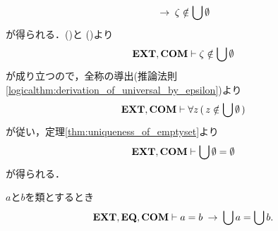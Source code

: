 \begin{sketch}
\begin{align}
			\hspace{0.25em}\rightarrow\hspace{0.25em} \zeta \notin \bigcup \emptyset
			\label{fom:the_union_of_the_emptyset_is_empty_2}
		\end{align}
		が得られる．()と
		()より
		\begin{align}
			\mbox{{\bf EXT}},\mbox{\bf COM} \vdash \zeta \notin \bigcup \emptyset
		\end{align}
		が成り立つので，全称の導出(推論法則\ref{logicalthm:derivation_of_universal_by_epsilon})より
		\begin{align}
			\mbox{{\bf EXT}},\mbox{\bf COM} \vdash \forall z\, (\, z \notin \bigcup \emptyset\, )
		\end{align}
		が従い，定理\ref{thm:uniqueness_of_emptyset}より
		\begin{align}
			\mbox{{\bf EXT}},\mbox{\bf COM} \vdash \bigcup \emptyset = \emptyset
		\end{align}
		が得られる．
		\QED
	\end{sketch}
	
	\begin{screen}
		\begin{thm}[等しい類の合併は等しい]\label{thm:unions_of_equal_classes_are_equal}
			$a$と$b$を類とするとき
			\begin{align}
				\mbox{{\bf EXT}},\mbox{{\bf EQ}},\mbox{\bf COM} \vdash a = b \hspace{0.25em}\rightarrow\hspace{0.25em} \bigcup a = \bigcup b.
			\end{align}
		\end{thm}
	\end{screen}
	

